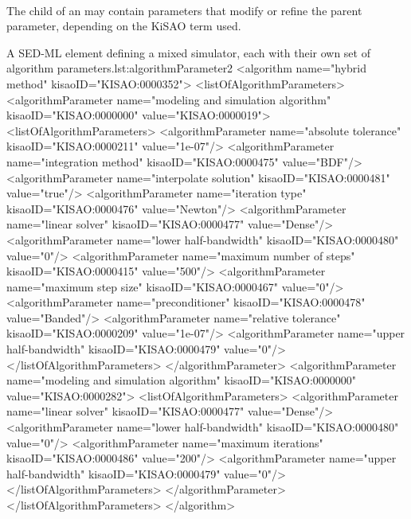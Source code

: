 \paragraph*{}
The child  of an \AlgorithmParameter may contain parameters that modify or refine the parent parameter, depending on the KiSAO term used.  

\begin{myXmlLst}{A SED-ML  element defining a mixed simulator, each with their own set of algorithm parameters.}{lst:algorithmParameter2}
<algorithm name="hybrid method" kisaoID="KISAO:0000352">
    <listOfAlgorithmParameters>
        <algorithmParameter name="modeling and simulation algorithm" kisaoID="KISAO:0000000" value="KISAO:0000019">
            <listOfAlgorithmParameters>
                <algorithmParameter name="absolute tolerance"   kisaoID="KISAO:0000211" value="1e-07"/>
                <algorithmParameter name="integration method"   kisaoID="KISAO:0000475" value="BDF"/>
                <algorithmParameter name="interpolate solution" kisaoID="KISAO:0000481" value="true"/>
                <algorithmParameter name="iteration type"       kisaoID="KISAO:0000476" value="Newton"/>
                <algorithmParameter name="linear solver"        kisaoID="KISAO:0000477" value="Dense"/>
                <algorithmParameter name="lower half-bandwidth" kisaoID="KISAO:0000480" value="0"/>
                <algorithmParameter name="maximum number of steps" kisaoID="KISAO:0000415" value="500"/>
                <algorithmParameter name="maximum step size"    kisaoID="KISAO:0000467" value="0"/>
                <algorithmParameter name="preconditioner"       kisaoID="KISAO:0000478" value="Banded"/>
                <algorithmParameter name="relative tolerance"   kisaoID="KISAO:0000209" value="1e-07"/>
                <algorithmParameter name="upper half-bandwidth" kisaoID="KISAO:0000479" value="0"/>
            </listOfAlgorithmParameters>
        </algorithmParameter>
        <algorithmParameter name="modeling and simulation algorithm" kisaoID="KISAO:0000000" value="KISAO:0000282">
            <listOfAlgorithmParameters>
                <algorithmParameter name="linear solver"        kisaoID="KISAO:0000477" value="Dense"/>
                <algorithmParameter name="lower half-bandwidth" kisaoID="KISAO:0000480" value="0"/>
                <algorithmParameter name="maximum iterations"   kisaoID="KISAO:0000486" value="200"/>
                <algorithmParameter name="upper half-bandwidth" kisaoID="KISAO:0000479" value="0"/>
            </listOfAlgorithmParameters>
        </algorithmParameter>
    </listOfAlgorithmParameters>
</algorithm>
\end{myXmlLst}


